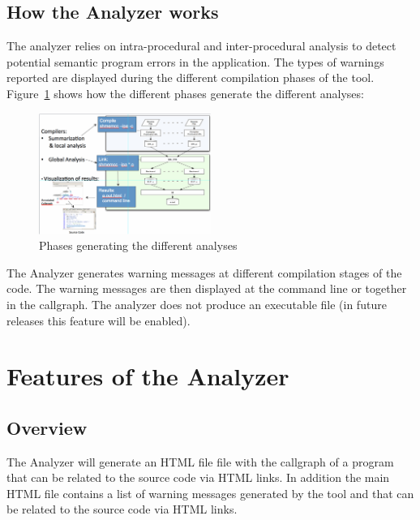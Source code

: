 \subsection{How the \openshmem Analyzer works}

The \openshmem analyzer relies on intra-procedural and inter-procedural
analysis to detect potential semantic program errors in the
application. The types of warnings reported are displayed during the
different compilation phases of the tool. Figure~\ref{fig:phases} shows
how the different phases generate the different analyses:

\begin{figure}[!h]
  \begin{center}
    \includegraphics[width=0.5\textwidth]{./image002}
    \caption{Phases generating the different analyses}
    \label{fig:phases}
  \end{center}
\end{figure}

The \openshmem Analyzer generates warning messages at different
compilation stages of the code. The warning messages are then
displayed at the command line or together in the callgraph.  The
\openshmem analyzer does not produce an executable file (in future
releases this feature will be enabled).

\section{Features of the \openshmem Analyzer}
\label{chapter:features}

\subsection{Overview}

The \openshmem Analyzer will generate an HTML file file with the
callgraph of a program that can be related to the source code via HTML
links. In addition the main HTML file contains a list of warning
messages generated by the tool and that can be related to the source
code via HTML links.

